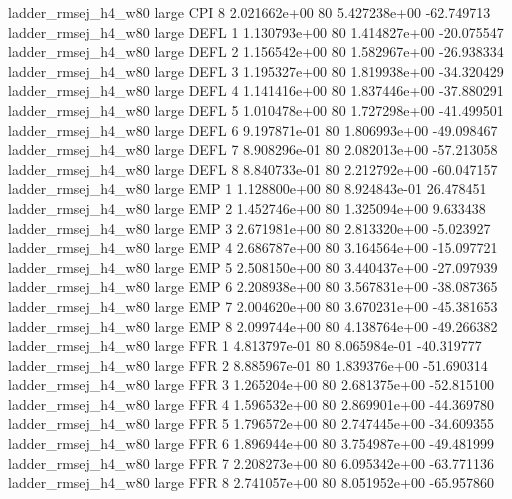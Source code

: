 ladder_rmsej_h4_w80      large      CPI                 8 2.021662e+00 80   5.427238e+00         -62.749713
ladder_rmsej_h4_w80      large     DEFL                 1 1.130793e+00 80   1.414827e+00         -20.075547
ladder_rmsej_h4_w80      large     DEFL                 2 1.156542e+00 80   1.582967e+00         -26.938334
ladder_rmsej_h4_w80      large     DEFL                 3 1.195327e+00 80   1.819938e+00         -34.320429
ladder_rmsej_h4_w80      large     DEFL                 4 1.141416e+00 80   1.837446e+00         -37.880291
ladder_rmsej_h4_w80      large     DEFL                 5 1.010478e+00 80   1.727298e+00         -41.499501
ladder_rmsej_h4_w80      large     DEFL                 6 9.197871e-01 80   1.806993e+00         -49.098467
ladder_rmsej_h4_w80      large     DEFL                 7 8.908296e-01 80   2.082013e+00         -57.213058
ladder_rmsej_h4_w80      large     DEFL                 8 8.840733e-01 80   2.212792e+00         -60.047157
ladder_rmsej_h4_w80      large      EMP                 1 1.128800e+00 80   8.924843e-01          26.478451
ladder_rmsej_h4_w80      large      EMP                 2 1.452746e+00 80   1.325094e+00           9.633438
ladder_rmsej_h4_w80      large      EMP                 3 2.671981e+00 80   2.813320e+00          -5.023927
ladder_rmsej_h4_w80      large      EMP                 4 2.686787e+00 80   3.164564e+00         -15.097721
ladder_rmsej_h4_w80      large      EMP                 5 2.508150e+00 80   3.440437e+00         -27.097939
ladder_rmsej_h4_w80      large      EMP                 6 2.208938e+00 80   3.567831e+00         -38.087365
ladder_rmsej_h4_w80      large      EMP                 7 2.004620e+00 80   3.670231e+00         -45.381653
ladder_rmsej_h4_w80      large      EMP                 8 2.099744e+00 80   4.138764e+00         -49.266382
ladder_rmsej_h4_w80      large      FFR                 1 4.813797e-01 80   8.065984e-01         -40.319777
ladder_rmsej_h4_w80      large      FFR                 2 8.885967e-01 80   1.839376e+00         -51.690314
ladder_rmsej_h4_w80      large      FFR                 3 1.265204e+00 80   2.681375e+00         -52.815100
ladder_rmsej_h4_w80      large      FFR                 4 1.596532e+00 80   2.869901e+00         -44.369780
ladder_rmsej_h4_w80      large      FFR                 5 1.796572e+00 80   2.747445e+00         -34.609355
ladder_rmsej_h4_w80      large      FFR                 6 1.896944e+00 80   3.754987e+00         -49.481999
ladder_rmsej_h4_w80      large      FFR                 7 2.208273e+00 80   6.095342e+00         -63.771136
ladder_rmsej_h4_w80      large      FFR                 8 2.741057e+00 80   8.051952e+00         -65.957860
